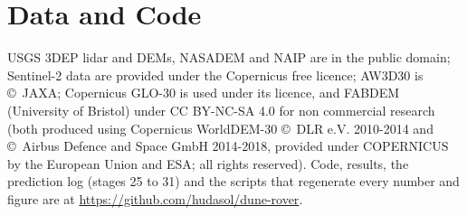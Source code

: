 \documentclass[conference]{IEEEtran}
\begin{document}
\section*{Data and Code}
USGS 3DEP lidar and DEMs, NASADEM and NAIP are in the public domain; Sentinel-2 data are provided under the Copernicus free licence; AW3D30 is \copyright~JAXA; Copernicus GLO-30 is used under its licence, and FABDEM (University of Bristol) under CC BY-NC-SA 4.0 for non commercial research (both produced using Copernicus WorldDEM-30 \copyright~DLR e.V. 2010-2014 and \copyright~Airbus Defence and Space GmbH 2014-2018, provided under COPERNICUS by the European Union and ESA; all rights reserved). Code, results, the prediction log (stages 25 to 31) and the scripts that regenerate every number and figure are at \url{https://github.com/hudasol/dune-rover}.



\end{document}
